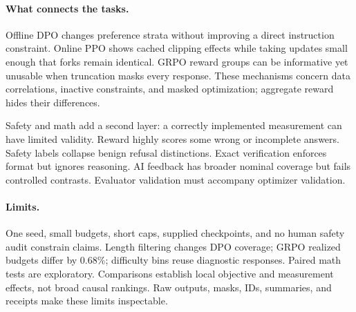 \documentclass{article}
\begin{document}
\paragraph{What connects the tasks.} Offline DPO changes preference strata without improving a direct instruction constraint. Online PPO shows cached clipping effects while taking updates small enough that forks remain identical. GRPO reward groups can be informative yet unusable when truncation masks every response. These mechanisms concern data correlations, inactive constraints, and masked optimization; aggregate reward hides their differences.

Safety and math add a second layer: a correctly implemented measurement can have limited validity. Reward highly scores some wrong or incomplete answers. Safety labels collapse benign refusal distinctions. Exact verification enforces format but ignores reasoning. AI feedback has broader nominal coverage but fails controlled contrasts. Evaluator validation must accompany optimizer validation.

\paragraph{Limits.} One seed, small budgets, short caps, supplied checkpoints, and no human safety audit constrain claims. Length filtering changes DPO coverage; GRPO realized budgets differ by 0.68\%; difficulty bins reuse diagnostic responses. Paired math tests are exploratory. Comparisons establish local objective and measurement effects, not broad causal rankings. Raw outputs, masks, IDs, summaries, and receipts make these limits inspectable.
\end{document}
